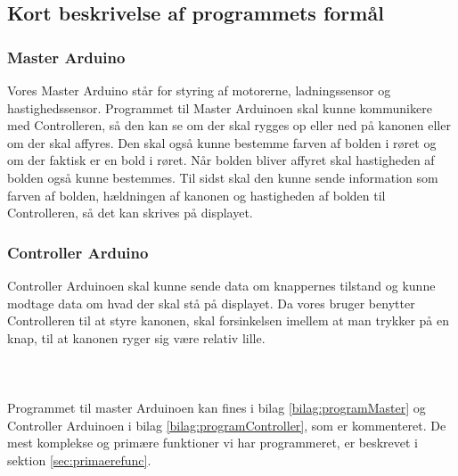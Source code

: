 \subsection{Kort beskrivelse af programmets formål}
\subsubsection{Master Arduino}
Vores Master Arduino står for styring af motorerne, ladningssensor og hastighedssensor. Programmet til Master Arduinoen skal kunne kommunikere med Controlleren, så den kan se om der skal rygges op eller ned på kanonen eller om der skal affyres. Den skal også kunne bestemme farven af bolden i røret og om der faktisk er en bold i røret. Når bolden bliver affyret skal hastigheden af bolden også kunne bestemmes. Til sidst skal den kunne sende information som farven af bolden, hældningen af kanonen og hastigheden af bolden til Controlleren, så det kan skrives på displayet.
\subsubsection{Controller Arduino}
Controller Arduinoen skal kunne sende data om knappernes tilstand og kunne modtage data om hvad der skal stå på displayet. Da vores bruger benytter Controlleren til at styre kanonen, skal forsinkelsen imellem at man trykker på en knap, til at kanonen ryger sig være relativ lille.\\
\\
\\
\\
Programmet til master Arduinoen kan fines i bilag \ref{bilag:programMaster} og Controller Arduinoen i bilag \ref{bilag:programController}, som er kommenteret. De mest komplekse og primære funktioner vi har programmeret, er beskrevet i sektion \ref{sec:primaerefunc}.

